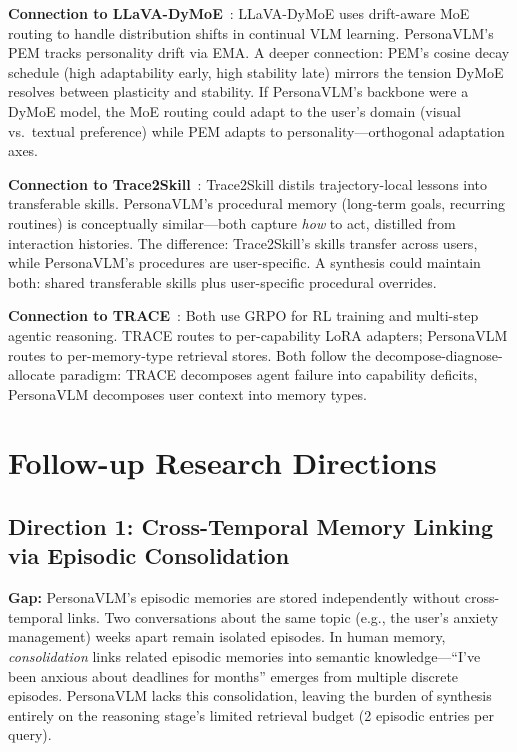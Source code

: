 \documentclass[11pt]{article}
\begin{document}
\textbf{Connection to LLaVA-DyMoE}~\cite{dyMoE}: LLaVA-DyMoE uses drift-aware MoE routing to handle distribution shifts in continual VLM learning. PersonaVLM's PEM tracks personality drift via EMA. A deeper connection: PEM's cosine decay schedule (high adaptability early, high stability late) mirrors the tension DyMoE resolves between plasticity and stability. If PersonaVLM's backbone were a DyMoE model, the MoE routing could adapt to the user's domain (visual vs.\ textual preference) while PEM adapts to personality---orthogonal adaptation axes.

\textbf{Connection to Trace2Skill}~\cite{trace2skill}: Trace2Skill distils trajectory-local lessons into transferable skills. PersonaVLM's procedural memory (long-term goals, recurring routines) is conceptually similar---both capture \textit{how} to act, distilled from interaction histories. The difference: Trace2Skill's skills transfer across users, while PersonaVLM's procedures are user-specific. A synthesis could maintain both: shared transferable skills plus user-specific procedural overrides.

\textbf{Connection to TRACE}~\cite{trace}: Both use GRPO for RL training and multi-step agentic reasoning. TRACE routes to per-capability LoRA adapters; PersonaVLM routes to per-memory-type retrieval stores. Both follow the decompose-diagnose-allocate paradigm: TRACE decomposes agent failure into capability deficits, PersonaVLM decomposes user context into memory types.

\section{Follow-up Research Directions}

\subsection{Direction 1: Cross-Temporal Memory Linking via Episodic Consolidation}

\textbf{Gap:} PersonaVLM's episodic memories are stored independently without cross-temporal links. Two conversations about the same topic (e.g., the user's anxiety management) weeks apart remain isolated episodes. In human memory, \textit{consolidation} links related episodic memories into semantic knowledge---``I've been anxious about deadlines for months'' emerges from multiple discrete episodes. PersonaVLM lacks this consolidation, leaving the burden of synthesis entirely on the reasoning stage's limited retrieval budget (2 episodic entries per query).
\end{document}
